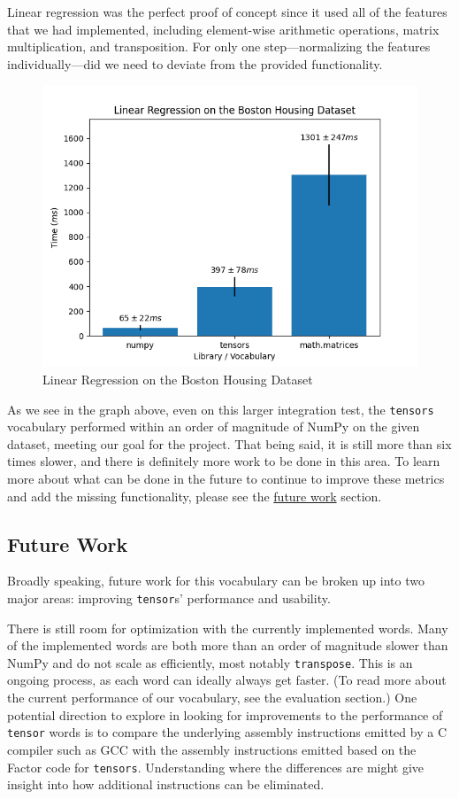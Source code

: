 \documentclass[
]{article}
\begin{document}
Linear regression was the perfect proof of concept since it used all of
the features that we had implemented, including element-wise arithmetic
operations, matrix multiplication, and transposition. For only one
step---normalizing the features individually---did we need to deviate
from the provided functionality.

\begin{figure}
\centering
\includegraphics{linear_regression.png}
\caption{Linear Regression on the Boston Housing Dataset}
\end{figure}

As we see in the graph above, even on this larger integration test, the
\texttt{tensors} vocabulary performed within an order of magnitude of
NumPy on the given dataset, meeting our goal for the project. That being
said, it is still more than six times slower, and there is definitely
more work to be done in this area. To learn more about what can be done
in the future to continue to improve these metrics and add the missing
functionality, please see the \href{future.md}{future work} section.

\hypertarget{future-work-2}{%
\subsection{Future Work}\label{future-work-2}}

Broadly speaking, future work for this vocabulary can be broken up into
two major areas: improving \texttt{tensor}s' performance and usability.

There is still room for optimization with the currently implemented
words. Many of the implemented words are both more than an order of
magnitude slower than NumPy and do not scale as efficiently, most
notably \texttt{transpose}. This is an ongoing process, as each word can
ideally always get faster. (To read more about the current performance
of our vocabulary, see the evaluation section.) One potential direction
to explore in looking for improvements to the performance of
\texttt{tensor} words is to compare the underlying assembly instructions
emitted by a C compiler such as GCC with the assembly instructions
emitted based on the Factor code for \texttt{tensors}. Understanding
where the differences are might give insight into how additional
instructions can be eliminated.
\end{document}
